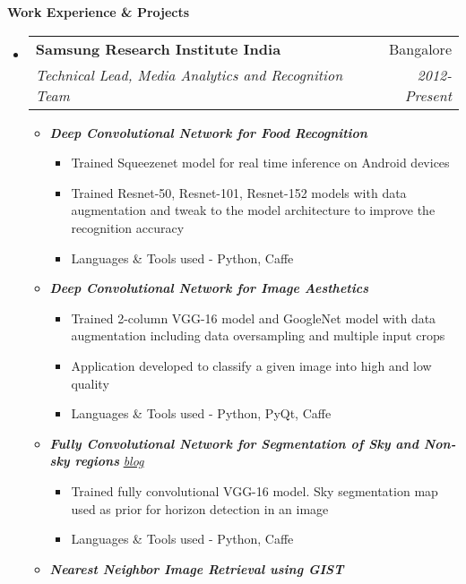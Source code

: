 \documentclass[letterpaper,11pt]{article}
\makeatletter
\newcommand{\resitem}[1]{\item #1 \vspace{-2pt}}
\newcommand{\resheading}[1]{{\large \colorbox{mygrey}{\begin{minipage}{\textwidth}{\textbf{#1 \vphantom{p\^{E}}}}\end{minipage}}}}
\newcommand{\ressubheading}[4]{
	\begin{tabular*}{7.0in}{l@{\extracolsep{\fill}}r}
		\textbf{#1} & #2 \\
		\textit{#3} & \textit{#4} \\
	\end{tabular*}\vspace{-6pt}}
\makeatother
\begin{document}
\resheading{Work Experience \& Projects}
\begin{itemize}
	\item
		\ressubheading{Samsung Research Institute India}{Bangalore}{Technical Lead, Media Analytics and Recognition Team}{2012-Present}
		\vspace{4mm}
		\begin{itemize}
				\resitem[]{\faCircleO
					\hspace{1mm}\textbf{\emph{Deep Convolutional Network for Food Recognition}}\hspace{1mm}}
				\begin{itemize}
						\resitem{Trained Squeezenet model for real time inference on Android devices}
						\resitem{Trained Resnet-50, Resnet-101, Resnet-152 models with data augmentation and tweak to the model architecture to improve the recognition accuracy}
						\resitem{Languages \& Tools used - Python, Caffe}
				\end{itemize}
				\vspace{2.5mm}
				\resitem[]{\faCircleO
					\hspace{1mm}\textbf{\emph{Deep Convolutional Network for Image Aesthetics}}\hspace{1mm}}
				\begin{itemize}
						\resitem{Trained 2-column VGG-16 model and GoogleNet model with data augmentation including data oversampling and multiple input crops}
						\resitem{Application developed to classify a given image into high and low quality}
						\resitem{Languages \& Tools used - Python, PyQt, Caffe}
				\end{itemize}
				\vspace{2.5mm}
				\resitem[]{\faCircleO
					\hspace{1mm}\textbf{\emph{Fully Convolutional Network for Segmentation of Sky and Non-sky regions}}\hspace{1mm}
					\faGlobe \hspace{1mm} \href{https://nrupatunga.github.io/fcn-segmentation/}{\emph{blog}}}
				\begin{itemize}
						\resitem{Trained fully convolutional VGG-16 model. Sky segmentation map used as prior for horizon detection in an image}
						\resitem{Languages \& Tools used - Python, Caffe}
				\end{itemize}
				\vspace{2.5mm}
				\resitem[]{\faCircleO \hspace{1mm}\textbf{\emph{Nearest Neighbor Image Retrieval using GIST}}\hspace{1mm}
}
\end{itemize}
\end{itemize}
\end{document}
